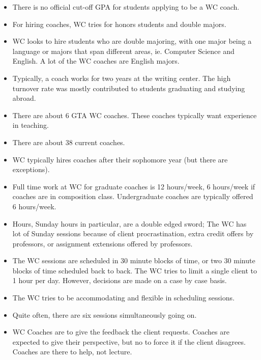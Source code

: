 \documentclass[12pt]{article} %
\begin{document}
\begin{itemize}
    \item There is no official cut-off GPA for students applying to be a WC coach.
     
    \item For hiring coaches, WC tries for honors students and double majors.
     
    \item WC looks to hire students who are double majoring, with one major being a language or majors that span different areas, ie. Computer Science and English. 
    A lot of the WC coaches are English majors.
     
    \item Typically, a coach works for two years at the writing center.  The high turnover rate was mostly contributed to students graduating and studying abroad.
     
    \item There are about 6 GTA WC coaches.  These coaches typically want experience in teaching.
     
    \item There are about 38 current coaches.
     
    \item WC typically hires coaches after their sophomore year (but there are exceptions).
     
    \item Full time work at WC for graduate coaches is 12 hours/week, 6 hours/week if coaches are in composition class.  Undergraduate coaches are typically offered 6 hours/week.
     
    \item Hours, Sunday hours in particular, are a double edged sword; The WC has lot of Sunday sessions because of client procrastination, extra credit offers by professors, or assignment extensions offered by professors.
     
    \item The WC sessions are scheduled in 30 minute blocks of time, or two 30 minute blocks of time scheduled back to back.  The WC tries to limit a single client to 1 hour per day.  However, decisions are made on a case by case basis.
     
    \item The WC tries to be accommodating and flexible in scheduling sessions.
     
    \item Quite often, there are six sessions simultaneously going on.
     
    \item WC Coaches are to give the feedback the client requests.  Coaches  are expected to give their perspective, but no to force it if the client disagrees.  Coaches are there to help, not lecture.
     

\end{itemize}
\end{document}
